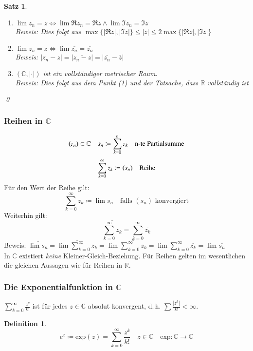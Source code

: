 \documentclass[ngerman,titlepage,twoside, parskip=half*]{scrreprt}
\newcommand*{\R}{\mathbb{R}}
\newcommand*{\C}{\mathbb{C}}
\theoremstyle{plain}
\newtheorem{theorem}{Satz}[section]
\theoremstyle{definition}
\newtheorem{definition}{Definition}
\theoremstyle{remark}
\begin{document}
\begin{theorem}
\begin{enumerate}[(1)]
  \item $\lim z_n=z\Leftrightarrow \lim\Re z_n =\Re z \wedge \lim \Im z_n=\Im z$\\
    Beweis: Dies folgt aus $\max\{|\Re z|,|\Im z|\}\leq |z|\leq 2\max\{|\Re z|,|\Im z|\}$
  \item $\lim z_n=z\Leftrightarrow \lim \overline{z_n}=\overline{z_n}$\\
    Beweis: $|z_n-z|=|\overline{z_n-z}|=|\overline{z_n}-\overline{z}|$
  \item $(\C,|\cdot |)$ ist ein vollständiger metrischer Raum.\\
    Beweis: Dies folgt aus dem Punkt (1) und der Tatsache, dass $\R$ vollständig ist
\end{enumerate}
\qed
\end{theorem}

\subsubsection{Reihen in $\C$}
\[(z_n)\subset \C\quad s_n\coloneqq\sum_{k=0}^n z_k \quad \text{n-te Partialsumme\index{Partialsumme}}\]
\[\sum_{k=0}^{\infty} z_k\coloneqq(s_n) \quad \text{Reihe\index{Reihe}}\]
Für den Wert der Reihe gilt:
\[\sum_{k=0}^{\infty} z_k\coloneqq\lim s_n \quad \text{falls }(s_n) \text{ konvergiert}\]
Weiterhin gilt:
\[\overline{\sum_{k=0}^{\infty} z_k}=\sum_{k=0}^\infty \overline{z_k}\]
Beweis: $\overline{\lim s_n}=\overline{\lim\sum_{k=0}^\infty z_k}=\lim \overline{\sum_{k=0}^\infty
z_k}=\lim \sum_{k=0}^\infty \overline{z_k}=\lim \overline{s_n}$\\
In $\C$ existiert \emph{keine} Kleiner-Gleich-Beziehung. Für Reihen gelten im wesentlichen die
gleichen Aussagen wie für Reihen in $\R$.

\subsubsection{Die Exponentialfunktion in $\C$}

$\sum_{k=0}^\infty \frac{z^k}{k!}$ ist für jedes $z\in\C$ absolut konvergent, d.\,h. $\sum \frac{|z^k|}{k!}
<\infty$.
\begin{definition}
\[e^z\coloneqq\text{exp}(z)=\sum_{k=0}^\infty \frac{z^k}{k!}\quad z\in\C\quad\text{exp}\colon\C\rightarrow\C\]
\end{definition}
\end{document}
